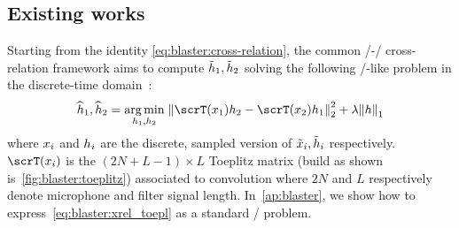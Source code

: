 \subsection{Existing works}\label{subsec:blaster:sota}
Starting from the identity \cref{eq:blaster:cross-relation}, the common \SIMO/-\BCE/ cross-relation framework aims to compute $\tilde{h}_1, \tilde{h}_2$ solving the following \LASSO/-like problem in the discrete-time domain~:
\begin{equation}
    \label{eq:blaster:xrel_toepl}
    \disFilterHat_1, \disFilterHat_2
    =
    \kargmin_{\disFilter_1, \disFilter_2}
    \;
    \kvvbar{
        \scrT(\disRecordedSignal_1) \disFilter_2
        -
        \scrT(\disRecordedSignal_2) \disFilter_1
    }_2^2
    +
    \lambda
    \kvvbar{
        \disFilter
    }_1
\end{equation}
where $x_i$ and $h_i$ are the discrete, sampled version of $\tilde{x}_i, \tilde{h}_i$ respectively.
\\$\scrT(\disRecordedSignal_i)$ is the $(2N+L-1) \times L$ Toeplitz matrix (build as shown is~\cref{fig:blaster:toeplitz})
associated to convolution where $2N$ and $L$ respectively denote  microphone and filter signal length.
In~\cref{ap:blaster}, we show how to express~\cref{eq:blaster:xrel_toepl} as a standard \LASSO/ problem.

